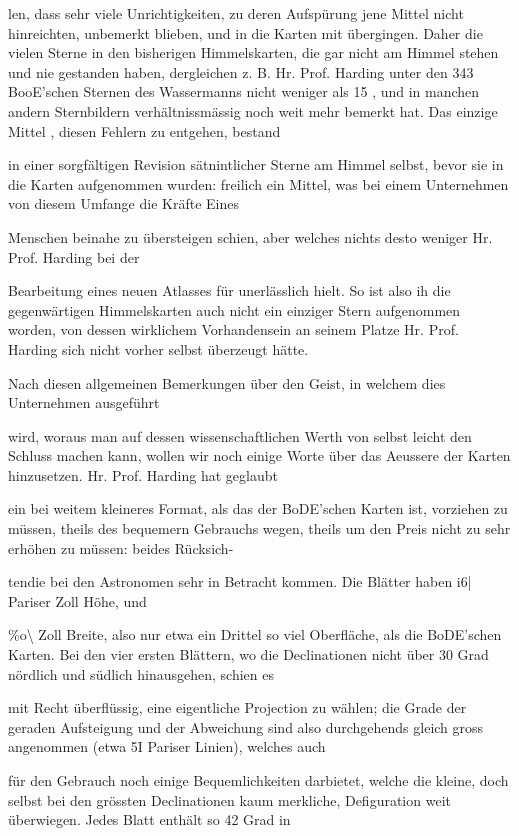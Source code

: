 \documentclass[10pt,a4paper]{article}
\begin{document}
len, dass sehr viele Unrichtigkeiten, zu deren Aufspürung jene Mittel nicht hinreichten, unbemerkt blieben, und in die Karten mit übergingen. Daher die vielen Sterne in den bisherigen Himmelskarten, die gar nicht am Himmel stehen und nie gestanden haben, dergleichen z. B. Hr. Prof. Harding unter den 343 BooE'schen Sternen des Wassermanns nicht weniger als 15 , und in manchen andern Sternbildern verhältnissmässig noch weit mehr bemerkt hat. Das einzige Mittel , diesen Fehlern zu entgehen, bestand

in einer sorgfältigen Revision sätnintlicher Sterne am Himmel selbst, bevor sie in die Karten aufgenommen wurden: freilich ein Mittel, was bei einem Unternehmen von diesem Umfange die Kräfte Eines

Menschen beinahe zu übersteigen schien, aber welches nichts desto weniger Hr. Prof. Harding bei der

Bearbeitung eines neuen Atlasses für unerlässlich hielt. So ist also ih die gegenwärtigen Himmelskarten auch nicht ein einziger Stern aufgenommen worden, von dessen wirklichem Vorhandensein an seinem Platze Hr. Prof. Harding sich nicht vorher selbst überzeugt hätte.

Nach diesen allgemeinen Bemerkungen über den Geist, in welchem dies Unternehmen ausgeführt

wird, woraus man auf dessen wissenschaftlichen Werth von selbst leicht den Schluss machen kann, wollen wir noch einige Worte über das Aeussere der Karten hinzusetzen. Hr. Prof. Harding hat geglaubt

ein bei weitem kleineres Format, als das der BoDE'schen Karten ist, vorziehen zu müssen, theils des bequemern Gebrauchs wegen, theils um den Preis nicht zu sehr erhöhen zu müssen: beides Rücksich-

tendie bei den Astronomen sehr in Betracht kommen. Die Blätter haben i6| Pariser Zoll Höhe, und

\%o\textbackslash{} Zoll Breite, also nur etwa ein Drittel so viel Oberfläche, als die BoDE'schen Karten. Bei den vier ersten Blättern, wo die Declinationen nicht über 30 Grad nördlich und südlich hinausgehen, schien es

mit Recht überflüssig, eine eigentliche Projection zu wählen; die Grade der geraden Aufsteigung und der Abweichung sind also durchgehends gleich gross angenommen (etwa 5I Pariser Linien), welches auch

für den Gebrauch noch einige Bequemlichkeiten darbietet, welche die kleine, doch selbst bei den grössten Declinationen kaum merkliche, Defiguration weit überwiegen. Jedes Blatt enthält so 42 Grad in
\end{document}
